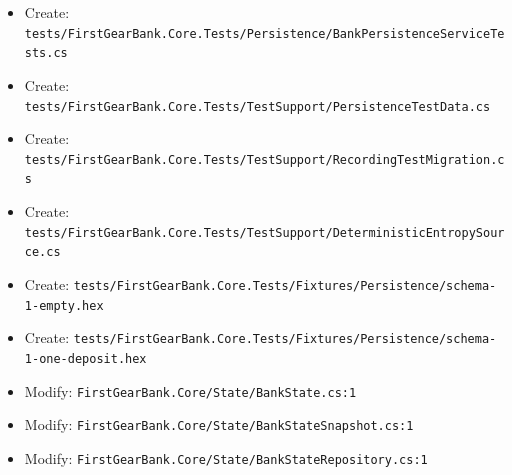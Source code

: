 \documentclass[
  10pt,
  letterpaper,
]{article}
\begin{document}
\begin{itemize}
  \texttt{tests/}\allowbreak{}\texttt{FirstGearBank.}\allowbreak{}\texttt{Core.}\allowbreak{}\texttt{Tests/}\allowbreak{}\texttt{Persistence/}\allowbreak{}\texttt{InstallMarkerTests.}\allowbreak{}\texttt{cs}
\item
  Create:
  \texttt{tests/}\allowbreak{}\texttt{FirstGearBank.}\allowbreak{}\texttt{Core.}\allowbreak{}\texttt{Tests/}\allowbreak{}\texttt{Persistence/}\allowbreak{}\texttt{BankPersistenceServiceTests.}\allowbreak{}\texttt{cs}
\item
  Create:
  \texttt{tests/}\allowbreak{}\texttt{FirstGearBank.}\allowbreak{}\texttt{Core.}\allowbreak{}\texttt{Tests/}\allowbreak{}\texttt{TestSupport/}\allowbreak{}\texttt{PersistenceTestData.}\allowbreak{}\texttt{cs}
\item
  Create:
  \texttt{tests/}\allowbreak{}\texttt{FirstGearBank.}\allowbreak{}\texttt{Core.}\allowbreak{}\texttt{Tests/}\allowbreak{}\texttt{TestSupport/}\allowbreak{}\texttt{RecordingTestMigration.}\allowbreak{}\texttt{cs}
\item
  Create:
  \texttt{tests/}\allowbreak{}\texttt{FirstGearBank.}\allowbreak{}\texttt{Core.}\allowbreak{}\texttt{Tests/}\allowbreak{}\texttt{TestSupport/}\allowbreak{}\texttt{DeterministicEntropySource.}\allowbreak{}\texttt{cs}
\item
  Create:
  \texttt{tests/}\allowbreak{}\texttt{FirstGearBank.}\allowbreak{}\texttt{Core.}\allowbreak{}\texttt{Tests/}\allowbreak{}\texttt{Fixtures/}\allowbreak{}\texttt{Persistence/}\allowbreak{}\texttt{schema-}\allowbreak{}\texttt{1-}\allowbreak{}\texttt{empty.}\allowbreak{}\texttt{hex}
\item
  Create:
  \texttt{tests/}\allowbreak{}\texttt{FirstGearBank.}\allowbreak{}\texttt{Core.}\allowbreak{}\texttt{Tests/}\allowbreak{}\texttt{Fixtures/}\allowbreak{}\texttt{Persistence/}\allowbreak{}\texttt{schema-}\allowbreak{}\texttt{1-}\allowbreak{}\texttt{one-}\allowbreak{}\texttt{deposit.}\allowbreak{}\texttt{hex}
\item
  Modify:
  \texttt{FirstGearBank.}\allowbreak{}\texttt{Core/}\allowbreak{}\texttt{State/}\allowbreak{}\texttt{BankState.}\allowbreak{}\texttt{cs:}\allowbreak{}\texttt{1}
\item
  Modify:
  \texttt{FirstGearBank.}\allowbreak{}\texttt{Core/}\allowbreak{}\texttt{State/}\allowbreak{}\texttt{BankStateSnapshot.}\allowbreak{}\texttt{cs:}\allowbreak{}\texttt{1}
\item
  Modify:
  \texttt{FirstGearBank.}\allowbreak{}\texttt{Core/}\allowbreak{}\texttt{State/}\allowbreak{}\texttt{BankStateRepository.}\allowbreak{}\texttt{cs:}\allowbreak{}\texttt{1}

\end{itemize}
\end{document}
